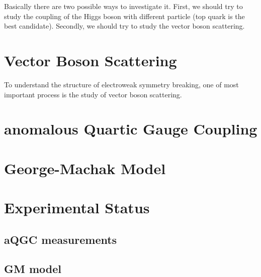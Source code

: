 Basically there are two possible ways to investigate it. First, we should try to study the coupling of the Higgs boson with different particle (top quark is the best candidate). Secondly, we should try to study the vector boson scattering.



\section{Vector Boson Scattering} %
\label{sec:vector_boson_scattering}
To understand the structure of electroweak symmetry breaking, one of most important process is the study of vector boson scattering.


\section{anomalous Quartic Gauge Coupling} %
\label{sec:anomalous_quartic_gauge_coupling}


\section{George-Machak Model} %
\label{sec:george_machak_model}


\section{Experimental Status} %
\label{sec:experimental_status}

\subsection{aQGC measurements} %
\label{sub:aqgc_measurements}


\subsection{GM model} %
\label{sub:gm_model}







